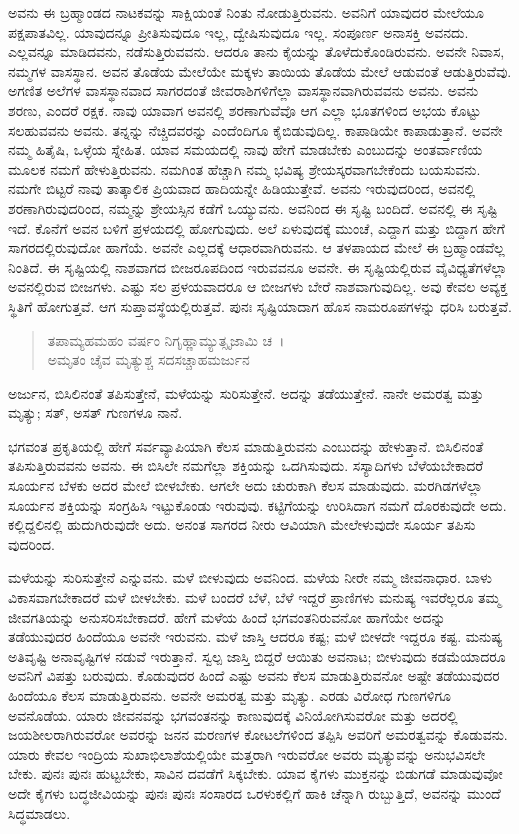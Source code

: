 ಅವನು ಈ ಬ್ರಹ್ಮಾಂಡದ ನಾಟಕವನ್ನು ಸಾಕ್ಷಿಯಂತೆ ನಿಂತು ನೋಡುತ್ತಿರುವನು. ಅವನಿಗೆ ಯಾವುದರ ಮೇಲೆಯೂ ಪಕ್ಷಪಾತವಿಲ್ಲ. ಯಾವುದನ್ನೂ ಪ್ರೀತಿಸುವುದೂ ಇಲ್ಲ, ದ್ವೇಷಿಸುವುದೂ ಇಲ್ಲ. ಸಂಪೂರ್ಣ ಅನಾಸಕ್ತಿ ಅವನದು. ಎಲ್ಲವನ್ನೂ ಮಾಡಿದವನು, ನಡೆಸುತ್ತಿರುವವನು. ಆದರೂ ತಾನು ಕೈಯನ್ನು ತೊಳೆದುಕೊಂಡಿರುವನು. ಅವನೇ ನಿವಾಸ, ನಮ್ಮಗಳ ವಾಸಸ್ಥಾನ. ಅವನ ತೊಡೆಯ ಮೇಲೆಯೇ ಮಕ್ಕಳು ತಾಯಿಯ ತೊಡೆಯ ಮೇಲೆ ಆಡುವಂತೆ ಆಡುತ್ತಿರುವೆವು. ಅಗಣಿತ ಅಲೆಗಳ ವಾಸಸ್ಥಾನವಾದ ಸಾಗರದಂತೆ ಜೀವರಾಶಿಗಳಿಗೆಲ್ಲಾ ವಾಸಸ್ಥಾನವಾಗಿರುವವನು ಅವನು. ಅವನು ಶರಣು, ಎಂದರೆ ರಕ್ಷಕ. ನಾವು ಯಾವಾಗ ಅವನಲ್ಲಿ ಶರಣಾಗುವೆವೊ ಆಗ ಎಲ್ಲಾ ಭೂತಗಳಿಂದ ಅಭಯ ಕೊಟ್ಟು ಸಲಹುವವನು ಅವನು. ತನ್ನನ್ನು ನೆಚ್ಚಿದವರನ್ನು ಎಂದೆಂದಿಗೂ ಕೈಬಿಡುವುದಿಲ್ಲ. ಕಾಪಾಡಿಯೇ ಕಾಪಾಡುತ್ತಾನೆ. ಅವನೇ ನಮ್ಮ ಹಿತೈಷಿ, ಒಳ್ಳೆಯ ಸ್ನೇಹಿತ. ಯಾವ ಸಮಯದಲ್ಲಿ ನಾವು ಹೇಗೆ ಮಾಡಬೇಕು ಎಂಬುದನ್ನು ಅಂತರ್ವಾಣಿಯ ಮೂಲಕ ನಮಗೆ ಹೇಳುತ್ತಿರುವನು. ನಮಗಿಂತ ಹೆಚ್ಚಾಗಿ ನಮ್ಮ ಭವಿಷ್ಯ ಶ್ರೇಯಸ್ಕರವಾಗಬೇಕೆಂದು ಬಯಸುವನು. ನಮಗೇ ಬಿಟ್ಟರೆ ನಾವು ತಾತ್ಕಾಲಿಕ ಪ್ರಿಯವಾದ ಹಾದಿಯನ್ನೇ ಹಿಡಿಯುತ್ತೇವೆ. ಅವನು ಇರುವುದರಿಂದ, ಅವನಲ್ಲಿ ಶರಣಾಗಿರುವುದರಿಂದ, ನಮ್ಮನ್ನು ಶ್ರೇಯಸ್ಸಿನ ಕಡೆಗೆ ಒಯ್ಯುವನು. ಅವನಿಂದ ಈ ಸೃಷ್ಟಿ ಬಂದಿದೆ. ಅವನಲ್ಲಿ ಈ ಸೃಷ್ಟಿ ಇದೆ. ಕೊನೆಗೆ ಅವನ ಬಳಿಗೆ ಪ್ರಳಯದಲ್ಲಿ ಹೋಗುವುದು. ಅಲೆ ಏಳುವುದಕ್ಕೆ ಮುಂಚೆ, ಎದ್ದಾಗ ಮತ್ತು ಬಿದ್ದಾಗ ಹೇಗೆ ಸಾಗರದಲ್ಲಿರುವುದೋ ಹಾಗೆಯೆ. ಅವನೇ ಎಲ್ಲದಕ್ಕೆ ಆಧಾರವಾಗಿರುವನು. ಆ ತಳಪಾಯದ ಮೇಲೆ ಈ ಬ್ರಹ್ಮಾಂಡವೆಲ್ಲ ನಿಂತಿದೆ. ಈ ಸೃಷ್ಟಿಯಲ್ಲಿ ನಾಶವಾಗದ ಬೀಜರೂಪದಿಂದ ಇರುವವನೂ ಅವನೇ. ಈ ಸೃಷ್ಟಿಯಲ್ಲಿರುವ ವೈವಿಧ್ಯತೆಗಳೆಲ್ಲಾ ಅವನಲ್ಲಿರುವ ಬೀಜಗಳು. ಎಷ್ಟು ಸಲ ಪ್ರಳಯವಾದರೂ ಆ ಬೀಜಗಳು ಬೇರೆ ನಾಶವಾಗುವುದಿಲ್ಲ. ಅವು ಕೇವಲ ಅವ್ಯಕ್ತ ಸ್ಥಿತಿಗೆ ಹೋಗುತ್ತವೆ. ಆಗ ಸುಪ್ತಾವಸ್ಥೆಯಲ್ಲಿರುತ್ತವೆ. ಪುನಃ ಸೃಷ್ಟಿಯಾದಾಗ ಹೊಸ ನಾಮರೂಪಗಳನ್ನು ಧರಿಸಿ ಬರುತ್ತವೆ.

\begin{verse}
ತಪಾಮ್ಯಹಮಹಂ ವರ್ಷಂ ನಿಗೃಹ್ಣಾಮ್ಯುತ್ಸೃಜಾಮಿ ಚ~।\\ಅಮೃತಂ ಚೈವ ಮೃತ್ಯುಶ್ಚ ಸದಸಚ್ಚಾಹಮರ್ಜುನ 
\end{verse}

{\small ಅರ್ಜುನ, ಬಿಸಿಲಿನಂತೆ ತಪಿಸುತ್ತೇನೆ, ಮಳೆಯನ್ನು ಸುರಿಸುತ್ತೇನೆ. ಅದನ್ನು ತಡೆಯುತ್ತೇನೆ. ನಾನೇ ಅಮರತ್ವ ಮತ್ತು ಮೃತ್ಯು; ಸತ್, ಅಸತ್ ಗುಣಗಳೂ ನಾನೆ.}

ಭಗವಂತ ಪ್ರಕೃತಿಯಲ್ಲಿ ಹೇಗೆ ಸರ್ವವ್ಯಾಪಿಯಾಗಿ ಕೆಲಸ ಮಾಡುತ್ತಿರುವನು ಎಂಬುದನ್ನು ಹೇಳುತ್ತಾನೆ. ಬಿಸಿಲಿನಂತೆ ತಪಿಸುತ್ತಿರುವವನು ಅವನು. ಈ ಬಿಸಿಲೇ ನಮಗೆಲ್ಲಾ ಶಕ್ತಿಯನ್ನು ಒದಗಿಸುವುದು. ಸಸ್ಯಾದಿಗಳು ಬೆಳೆಯಬೇಕಾದರೆ ಸೂರ್ಯನ ಬೆಳಕು ಅದರ ಮೇಲೆ ಬೀಳಬೇಕು. ಆಗಲೇ ಅದು ಚುರುಕಾಗಿ ಕೆಲಸ ಮಾಡುವುದು. ಮರಗಿಡಗಳೆಲ್ಲಾ ಸೂರ್ಯನ ಶಕ್ತಿಯನ್ನು ಸಂಗ್ರಹಿಸಿ ಇಟ್ಟುಕೊಂಡು ಇರುವುವು. ಕಟ್ಟಿಗೆಯನ್ನು ಉರಿಸಿದಾಗ ನಮಗೆ ದೊರಕುವುದೇ ಅದು. ಕಲ್ಲಿದ್ದಲಿನಲ್ಲಿ ಹುದುಗಿರುವುದೇ ಅದು. ಅನಂತ ಸಾಗರದ ನೀರು ಆವಿಯಾಗಿ ಮೇಲೇಳುವುದೇ ಸೂರ್ಯ ತಪಿಸು ವುದರಿಂದ.

ಮಳೆಯನ್ನು ಸುರಿಸುತ್ತೇನೆ ಎನ್ನುವನು. ಮಳೆ ಬೀಳುವುದು ಅವನಿಂದ. ಮಳೆಯ ನೀರೇ ನಮ್ಮ ಜೀವನಾಧಾರ. ಬಾಳು ವಿಕಾಸವಾಗಬೇಕಾದರೆ ಮಳೆ ಬೀಳಬೇಕು. ಮಳೆ ಬಂದರೆ ಬೆಳೆ, ಬೆಳೆ ಇದ್ದರೆ ಪ್ರಾಣಿಗಳು ಮನುಷ್ಯ ಇವರೆಲ್ಲರೂ ತಮ್ಮ ಜೀವಗತಿಯನ್ನು ಅನುಸರಿಸಬೇಕಾದರೆ. ಹೇಗೆ ಮಳೆಯ ಹಿಂದೆ ಭಗವಂತನಿರುವನೋ ಹಾಗೆಯೇ ಅದನ್ನು ತಡೆಯುವುದರ ಹಿಂದೆಯೂ ಅವನೇ ಇರುವನು. ಮಳೆ ಜಾಸ್ತಿ ಆದರೂ ಕಷ್ಟ; ಮಳೆ ಬೀಳದೇ ಇದ್ದರೂ ಕಷ್ಟ. ಮನುಷ್ಯ ಅತಿವೃಷ್ಟಿ ಅನಾವೃಷ್ಟಿಗಳ ನಡುವೆ ಇರುತ್ತಾನೆ. ಸ್ವಲ್ಪ ಜಾಸ್ತಿ ಬಿದ್ದರೆ ಆಯಿತು ಅವನಾಟ; ಬೀಳುವುದು ಕಡಮೆಯಾದರೂ ಅವನಿಗೆ ವಿಪತ್ತು ಬರುವುದು. ಕೊಡುವುದರ ಹಿಂದೆ ಎಷ್ಟು ಅವನು ಕೆಲಸ ಮಾಡುತ್ತಿರುವನೋ ಅಷ್ಟೇ ತಡೆಯುವುದರ ಹಿಂದೆಯೂ ಕೆಲಸ ಮಾಡುತ್ತಿರುವನು. ಅವನೇ ಅಮರತ್ವ ಮತ್ತು ಮೃತ್ಯು. ಎರಡು ವಿರೋಧ ಗುಣಗಳಿಗೂ ಅವನೊಡೆಯ. ಯಾರು ಜೀವನವನ್ನು ಭಗವಂತನನ್ನು ಕಾಣುವುದಕ್ಕೆ ವಿನಿಯೋಗಿಸುವರೋ ಮತ್ತು ಅದರಲ್ಲಿ ಜಯಶೀಲರಾಗಿರುವರೋ ಅವರನ್ನು ಜನನ ಮರಣಗಳ ಕೋಟಲೆಗಳಿಂದ ತಪ್ಪಿಸಿ ಅವರಿಗೆ ಅಮರತ್ವವನ್ನು ಕೊಡುವನು. ಯಾರು ಕೇವಲ ಇಂದ್ರಿಯ ಸುಖಾಭಿಲಾಶೆಯಲ್ಲಿಯೇ ಮತ್ತರಾಗಿ ಇರುವರೋ ಅವರು ಮೃತ್ಯುವನ್ನು ಅನುಭವಿಸಲೇ ಬೇಕು. ಪುನಃ ಪುನಃ ಹುಟ್ಟಬೇಕು, ಸಾವಿನ ದವಡೆಗೆ ಸಿಕ್ಕಬೇಕು. ಯಾವ ಕೈಗಳು ಮುಕ್ತನನ್ನು ಬಿಡುಗಡೆ ಮಾಡುವುವೋ ಅದೇ ಕೈಗಳು ಬದ್ಧಜೀವಿಯನ್ನು ಪುನಃ ಪುನಃ ಸಂಸಾರದ ಒರಳುಕಲ್ಲಿಗೆ ಹಾಕಿ ಚೆನ್ನಾಗಿ ರುಬ್ಬುತ್ತಿದೆ, ಅವನನ್ನು ಮುಂದೆ ಸಿದ್ಧಮಾಡಲು.

